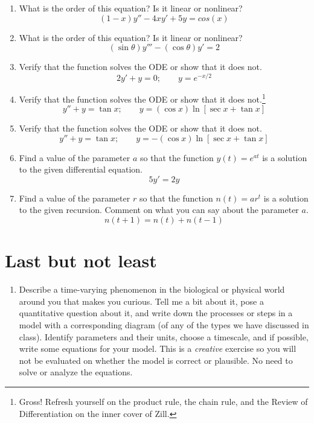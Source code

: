 \documentclass[11pt,onecolumn,superscriptaddress,notitlepage]{article}
\begin{document}
\begin{enumerate}[resume]
	\item What is the order of this equation? Is it linear or nonlinear? 
	$$(1-x)y'' - 4xy' + 5y = cos(x)$$
	\item What is the order of this equation? Is it linear or nonlinear? 
	$$(\sin \theta) y''' - (\cos \theta) y' = 2$$
	\item Verify that the function solves the ODE or show that it does not. 
	$$2y' + y = 0; \qquad y=e^{-x/2}$$
	\item Verify that the function solves the ODE or show that it does not.\footnote{Gross! Refresh yourself on the product rule, the chain rule, and the Review of Differentiation on the inner cover of Zill.}
	$$y'' + y = \tan{x}; \qquad y=(\cos{x})\ln[\sec{x} + \tan{x}]$$
	\item Verify that the function solves the ODE or show that it does not.
	$$y'' + y = \tan{x}; \qquad y=-(\cos{x})\ln[\sec{x} + \tan{x}]$$
	\item Find a value of the parameter $a$ so that the function $y(t)=e^{at}$ is a solution to the given differential equation.
	$$ 5y' = 2y$$
	\item Find a value of the parameter $r$ so that the function $n(t) = a r^t$ is a solution to the given recursion. Comment on what you can say about the parameter $a$. 
	$$ n(t+1) = n(t) + n(t-1)$$
\end{enumerate}

\section*{Last but not least}
\begin{enumerate}[resume]
	\item Describe a time-varying phenomenon in the biological or physical world around you that makes you curious. Tell me a bit about it, pose a quantitative question about it, and write down the processes or steps in a model with a corresponding diagram (of any of the types we have discussed in class). Identify parameters and their units, choose a timescale, and if possible, write some equations for your model. This is a {\it creative} exercise so you will not be evaluated on whether the model is correct or plausible. No need to solve or analyze the equations. 
\end{enumerate}


\end{document}
